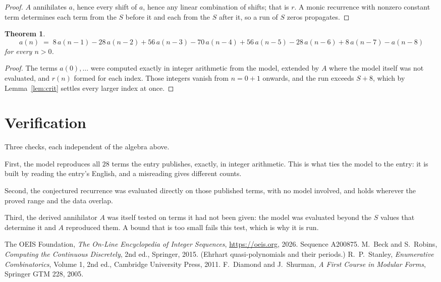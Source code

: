 \documentclass[11pt,a4paper]{article}
\theoremstyle{plain}
\newtheorem{theorem}{Theorem}
\theoremstyle{definition}
\begin{document}
\begin{proof}
$A$ annihilates $a$, hence every shift of $a$, hence any linear combination of shifts; that is
$r$. A monic recurrence with nonzero constant term determines each term from the $S$ before it
and each from the $S$ after it, so a run of $S$ zeros propagates.
\end{proof}

\begin{theorem}
\[
a(n)\;=\;8\,a(n-1) - 28\,a(n-2) + 56\,a(n-3) - 70\,a(n-4) + 56\,a(n-5) - 28\,a(n-6) + 8\,a(n-7) - a(n-8)
\]
for every $n>0$.
\end{theorem}

\begin{proof}
The terms $a(0),\dots$ were computed exactly in integer arithmetic from the model, extended by
$A$ where the model itself was not evaluated, and $r(n)$ formed for each index. Those integers
vanish from $n=0+1$ onwards, and the run exceeds $S+8$, which by
Lemma~\ref{lem:crit} settles every larger index at once.
\end{proof}

\section{Verification}

Three checks, each independent of the algebra above.

First, the model reproduces all $28$ terms the entry publishes, exactly, in integer
arithmetic. This is what ties the model to the entry: it is built by reading the entry's
English, and a misreading gives different counts.

Second, the conjectured recurrence was evaluated directly on those published terms, with no
model involved, and holds wherever the proved range and the data overlap.

Third, the derived annihilator $A$ was itself tested on terms it had not been given: the model
was evaluated beyond the $S$ values that determine it and $A$ reproduced them. A bound that is
too small fails this test, which is why it is run.

\begin{thebibliography}{9}
 The OEIS Foundation, \emph{The On-Line Encyclopedia of Integer
Sequences}, \url{https://oeis.org}, 2026. Sequence A200875.
 M.~Beck and S.~Robins, \emph{Computing the Continuous Discretely},
2nd ed., Springer, 2015. (Ehrhart quasi-polynomials and their periods.)
 R.~P.~Stanley, \emph{Enumerative Combinatorics}, Volume 1, 2nd ed.,
Cambridge University Press, 2011.
 F.~Diamond and J.~Shurman, \emph{A First Course in Modular Forms},
Springer GTM 228, 2005.
\end{thebibliography}
\end{document}

